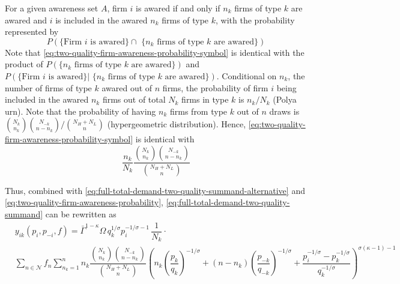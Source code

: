 \documentclass[12pt]{article}
\begin{document}
For a given awareness set $A$, firm $i$ is awared if and only if $n_k$ firms of type $k$ are awared and $i$ is included in the awared $n_k$ firms of type $k$, with the probability represented by
\begin{equation}\label{eq:two-quality-firm-awareness-probability-symbol}
P( \text{\{Firm $i$ is awared\} $\cap$ \{$n_k$ firms of type $k$ are awared\}})
\end{equation}
Note that \eqref{eq:two-quality-firm-awareness-probability-symbol} is identical with the product of $P( \text{\{$n_k$ firms of type $k$ are awared\}})$ and  $P( \text{\{Firm $i$ is awared\} | \{$n_k$ firms of type $k$ are awared\}})$. Conditional on $n_k$, the number of firms of type $k$ awared out of $n$ firms, the probability of firm $i$ being included in the awared $n_k$ firms out of total $N_k$ firms in type $k$ is $n_k / N_k$ (Polya urn). Note that the probability of having $n_k$ firms from type $k$ out of $n$ draws is $\binom{N_k}{n_k} \binom{N_{-k}}{n - n_k} / \binom{N_H + N_L}{n}$ (hypergeometric distribution). Hence, \eqref{eq:two-quality-firm-awareness-probability-symbol} is identical with
\begin{equation}\label{eq:two-quality-firm-awareness-probability}
\dfrac{n_k}{N_k}
\dfrac{\binom{N_k}{n_k} \binom{N_{-k}}{n - n_k}}{\binom{N_H + N_L}{n}} 
\end{equation}

Thus, combined with \eqref{eq:full-total-demand-two-quality-summand-alternative} and \eqref{eq:two-quality-firm-awareness-probability},  \eqref{eq:full-total-demand-two-quality-summand} can be rewritten as
\begin{equation}\label{eq:full-total-demand-two-quality-alternative}
\begin{aligned}
& y_{ik}(p_i, p_{-i}, f) 
=  \bar{\Gamma}^{1-\kappa}\Omega \, q_k^{1/\sigma}p_i^{-1/\sigma - 1}\, \dfrac{1}{N_k} \cdot \\ 
&\sum_{n \in \mathcal{N} } f_n   \sum_{n_k =1}^n  
n_k \dfrac{\binom{N_k}{n_k} \binom{N_{-k}}{n - n_k}}{\binom{N_H + N_L}{n}}
\left( 
n_k \left( \dfrac{p_{k}}{q_{k}}   \right)^{-1/\sigma} +  
(n - n_k) \left( \dfrac{p_{-k}}{q_{-k}}   \right)^{-1/\sigma} +
\dfrac{p_i^{-1/\sigma} - p^{-1/\sigma}_{k} }{ q_k^{-1/\sigma }} 
\right)^{\sigma (\kappa - 1)-1}
\end{aligned}
\end{equation}
\end{document}
